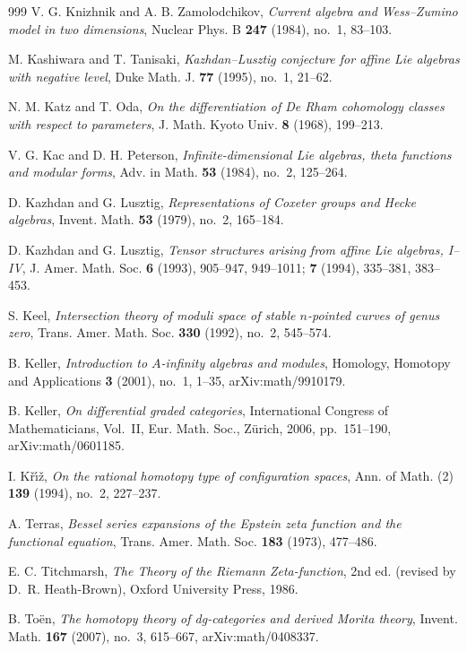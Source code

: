 \begin{thebibliography}{999}
V. G. Knizhnik and A. B. Zamolodchikov, \emph{Current algebra and Wess--Zumino model in two dimensions}, Nuclear Phys. B \textbf{247} (1984), no.~1, 83--103.

M. Kashiwara and T. Tanisaki, \emph{Kazhdan--Lusztig conjecture for affine Lie algebras with negative level}, Duke Math. J. \textbf{77} (1995), no.~1, 21--62.

N. M. Katz and T. Oda, \emph{On the differentiation of De Rham cohomology classes with respect to parameters}, J. Math. Kyoto Univ. \textbf{8} (1968), 199--213.

V. G. Kac and D. H. Peterson, \emph{Infinite-dimensional Lie algebras, theta functions and modular forms}, Adv. in Math. \textbf{53} (1984), no.~2, 125--264.

D. Kazhdan and G. Lusztig, \emph{Representations of Coxeter groups and Hecke algebras}, Invent. Math. \textbf{53} (1979), no.~2, 165--184.

D. Kazhdan and G. Lusztig, \emph{Tensor structures arising from affine Lie algebras, I--IV}, J. Amer. Math. Soc. \textbf{6} (1993), 905--947, 949--1011; \textbf{7} (1994), 335--381, 383--453.

S. Keel, \emph{Intersection theory of moduli space of stable $n$-pointed curves of genus zero}, Trans. Amer. Math. Soc. \textbf{330} (1992), no.~2, 545--574.

B. Keller, \emph{Introduction to $A$-infinity algebras and modules}, Homology, Homotopy and Applications \textbf{3} (2001), no.~1, 1--35, arXiv:math/9910179.

B. Keller, \emph{On differential graded categories}, International Congress of Mathematicians, Vol.~II, Eur. Math. Soc., Z\"urich, 2006, pp.~151--190, arXiv:math/0601185.

I. K\v{r}\'{\i}\v{z}, \emph{On the rational homotopy type of configuration spaces}, Ann. of Math. (2) \textbf{139} (1994), no.~2, 227--237.

A. Terras, \emph{Bessel series expansions of the Epstein zeta function and the functional equation}, Trans. Amer. Math. Soc. \textbf{183} (1973), 477--486.

E. C. Titchmarsh, \emph{The Theory of the Riemann Zeta-function}, 2nd ed. (revised by D.~R. Heath-Brown), Oxford University Press, 1986.

B. To\"en, \emph{The homotopy theory of dg-categories and derived Morita theory}, Invent. Math. \textbf{167} (2007), no.~3, 615--667, arXiv:math/0408337.


\end{thebibliography}
